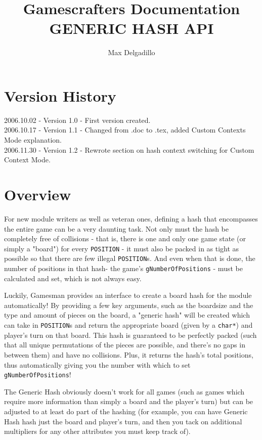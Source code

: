 \documentclass[11pt]{article}
\begin{document}
\title{Gamescrafters Documentation\\
GENERIC HASH API}
\author{Max Delgadillo}
\date{}
\maketitle

\section*{Version History}
2006.10.02 - Version 1.0 - First version created.\\
2006.10.17 - Version 1.1 - Changed from .doc to .tex, added Custom Contexts Mode explanation.\\
2006.11.30 - Version 1.2 - Rewrote section on hash context switching for Custom Context Mode.

\tableofcontents
\newpage

\section{Overview}
For new module writers as well as veteran ones, defining a hash that encompasses the entire game can be a very daunting task. Not only must the hash be completely free of collisions - that is, there is one and only one game state (or simply a "board") for every \texttt{POSITION} - it must also be packed in as tight as possible so that there are few illegal \texttt{POSITION}s. And even when that is done, the number of positions in that hash- the game's \texttt{gNumberOfPositions} - must be calculated and set, which is not always easy.

Luckily, Gamesman provides an interface to create a board hash for the module automatically! By providing a few key arguments, such as the boardsize and the type and amount of pieces on the board, a "generic hash" will be created which can take in \texttt{POSITION}s and return the appropriate board (given by a \texttt{char*}) and player's turn on that board. This hash is guaranteed to be perfectly packed (such that all unique permutations of the pieces are possible, and there's no gaps in between them) and have no collisions. Plus, it returns the hash's total positions, thus automatically giving you the number with which to set \texttt{gNumberOfPositions}!

The Generic Hash obviously doesn't work for all games (such as games which require more information than simply a board and the player's turn) but can be adjusted to at least do part of the hashing (for example, you can have Generic Hash hash just the board and player's turn, and then you tack on additional multipliers for any other attributes you must keep track of).
\end{document}
